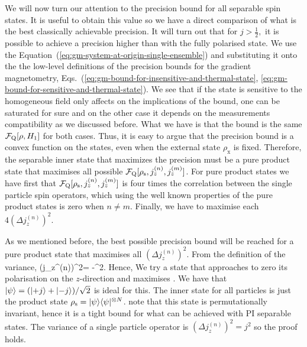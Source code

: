 We will now turn our attention to
the precision bound for all separable spin states.
It is useful to obtain this value so we have a direct comparison of what is
the best classically achievable precision.
It will turn out that for $j>\frac{1}{2},$ it is possible
to achieve a precision higher than with the fully polarised state.
We use the Equation~(\ref{eq:gm-system-at-origin-single-ensemble}) and substituting it onto the the low-level definitions of the precision bounds for the gradient magnetometry, Eqs.~(\ref{eq:gm-bound-for-insensitive-and-thermal-state}, \ref{eq:gm-bound-for-sensitive-and-thermal-state}).
We see that if the state is sensitive to the homogeneous field only affects on the implications of the bound, one can be saturated for sure and on the other case it depends on the measurements compatibility as we discussed before.
What we have is that the bound is the same $\mathcal{F}_{\textnormal{Q}}[{\textstyle \rho, H_1}]$ for both cases.
Thus, it is easy to argue that the precision bound is a convex function on the states, even when the external state $\rho_{\text{x}}$ is fixed.
Therefore, the separable inner state that maximizes the precision must be a pure product state that maximises all possible $\mathcal{F}_{\textnormal{Q}}[{\textstyle \rho_{\text{s}}, j_z^{(n)}, j_z^{(m)}}]$.%
For pure product states we have first that $\mathcal{F}_{\textnormal{Q}}[{\textstyle \rho_{\text{s}}, j_z^{(n)}, j_z^{(m)}}]$ is four times the correlation between the single particle spin operators, which using the well known properties of the pure product states is  zero when $n \neq m$.
Finally, we have to maximise each $4(\Delta j_z^{(n)})^2$.


As we mentioned before, the best possible precision bound will be reached for a pure product state that maximises all $(\Delta j_z^{(n)})^2$.
From the definition of the variance,
\be
(\Delta j_z^{(n)})^2=
-^2.
\ee
Hence, We try a state that approaches to zero its polarisation on the $z$-direction and maximises .
We have that  $\vert{\psi}\rangle=(\vert{+j}\rangle+\vert{-j}\rangle)/\sqrt{2}$ is ideal for this.
The inner state for all particles is just the product state $\rho_{\text{s}} =\vert{\psi}\rangle\langle{\psi}\vert^{\otimes N}$.
note that this state is permutationally invariant, hence it is a tight bound for what can be achieved with PI separable states.
The variance of a single particle operator is $(\Delta j_z^{(n)})^2=j^2$ so the proof holds.

